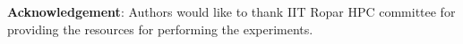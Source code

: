 \documentclass[12pt,3p]{article}
\begin{document}
%

\textbf{Acknowledgement}: Authors would like to thank IIT Ropar HPC committee for providing the resources for performing the experiments. 




\end{document}
